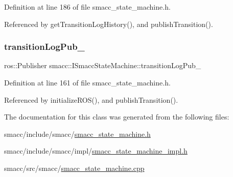Definition at line 186 of file smacc\+\_\+state\+\_\+machine.\+h.



Referenced by get\+Transition\+Log\+History(), and publish\+Transition().

\mbox{\label{classsmacc_1_1ISmaccStateMachine_acc42eb050325c1edc77d81675fb1286a}} 
\subsubsection{\texorpdfstring{transition\+Log\+Pub\+\_\+}{transitionLogPub\_}}
{\footnotesize\ttfamily ros\+::\+Publisher smacc\+::\+I\+Smacc\+State\+Machine\+::transition\+Log\+Pub\+\_\+\hspace{0.3cm}{\ttfamily [protected]}}



Definition at line 161 of file smacc\+\_\+state\+\_\+machine.\+h.



Referenced by initialize\+R\+O\+S(), and publish\+Transition().



The documentation for this class was generated from the following files\+:\begin{DoxyCompactItemize}
\item 
smacc/include/smacc/\hyperlink{smacc__state__machine_8h}{smacc\+\_\+state\+\_\+machine.\+h}\item 
smacc/include/smacc/impl/\hyperlink{smacc__state__machine__impl_8h}{smacc\+\_\+state\+\_\+machine\+\_\+impl.\+h}\item 
smacc/src/smacc/\hyperlink{smacc__state__machine_8cpp}{smacc\+\_\+state\+\_\+machine.\+cpp}\end{DoxyCompactItemize}
